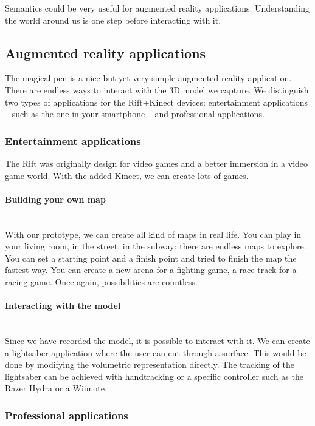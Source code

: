 \documentclass[12pt]{article}
\begin{document}
Semantics could be very useful for augmented reality applications. Understanding the world around us is one step before interacting with it.

\subsection{Augmented reality applications}
The magical pen is a nice but yet very simple augmented reality application. There are endless ways to interact with the 3D model we capture. We distinguish two types of applications for the Rift+Kinect devices: entertainment applications -- such as the one in your smartphone -- and professional applications.

\subsubsection{Entertainment applications}
The Rift was originally design for video games and a better immersion in a video game world. With the added Kinect, we can create lots of games.

\paragraph{Building your own map}~\\
With our prototype, we can create all kind of maps in real life. You can play in your living room, in the street, in the subway: there are endless maps to explore. You can set a starting point and a finish point and tried to finish the map the fastest way. You can create a new arena for a fighting game, a race track for a racing game. Once again, possibilities are countless.

\paragraph{Interacting with the model}~\\
Since we have recorded the model, it is possible to interact with it. We can create a lightsaber application where the user can cut through a surface. This would be done by modifying the volumetric representation directly. The tracking of the lightsaber can be achieved with handtracking or a specific controller such as the Razer Hydra or a Wiimote.

\subsubsection{Professional applications}
\end{document}
